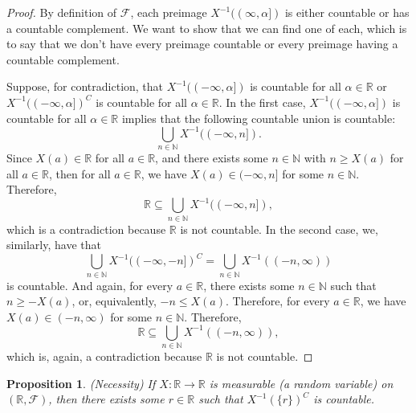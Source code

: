 \documentclass[12pt]{article}
\newtheorem{proposition}{Proposition}
\newcommand{\N}{\mathbb{N}}
\newcommand{\R}{\mathbb{R}}
\newcommand{\FF}{\mathcal{F}}
\begin{document}
\begin{proof}
    By definition of $\FF$, each preimage $X^{-1}((\infty,\alpha])$ is either countable or has a countable complement. We want to show that we can find one of each, which is to say that we don't have every preimage countable or every preimage having a countable complement.
    
    Suppose, for contradiction, that $X^{-1}((-\infty,\alpha])$ is countable for all $\alpha\in \R$ or $X^{-1}((-\infty,\alpha])^C$ is countable for all $\alpha\in \R$. In the first case, $X^{-1}((-\infty,\alpha])$ is countable for all $\alpha\in \R$ implies that the following countable union is countable:
    \[\bigcup_{n\in\N}X^{-1}((-\infty,n]).\]
    Since $X(a)\in\R$ for all $a\in\R$, and there exists some $n\in\N$ with $n\geq X(a)$ for all $a\in\R$, then for all $a\in\R$, we have $X(a)\in (-\infty,n]$ for some $n\in\N$. Therefore,
    \[\R\subseteq \bigcup_{n\in\N}X^{-1}((-\infty,n]),\]
    which is a contradiction because $\R$ is not countable. In the second case, we, similarly, have that
    \[\bigcup_{n\in\N}X^{-1}((-\infty,-n])^C = \bigcup_{n\in\N}X^{-1}((-n,\infty)) \]
    is countable. And again, for every $a\in\R$, there exists some $n\in\N$ such that $n\geq -X(a)$, or, equivalently, $-n\leq X(a)$. Therefore, for every $a\in\R$, we have $X(a) \in (-n,\infty)$ for some $n\in\N$. Therefore,
    \[\R \subseteq \bigcup_{n\in\N}X^{-1}((-n,\infty)),\]
    which is, again, a contradiction because $\R$ is not countable.
    
\end{proof}

\begin{proposition}
    (Necessity) If $X:\R\to\R$ is measurable (a random variable) on $(\R,\FF)$, then there exists some $r\in\R$ such that $X^{-1}(\{r\})^C$ is countable.
\end{proposition}
\end{document}

